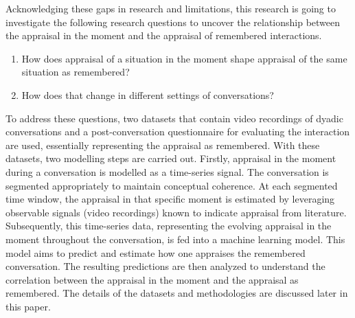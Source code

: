 
Acknowledging these gaps in research and limitations, this research is going to investigate the following research questions to uncover the relationship between the appraisal in the moment and the appraisal of remembered interactions. 

\begin{enumerate}
    \item How does appraisal of a situation in the moment shape appraisal of the same situation as remembered?
    \item How does that change in different settings of conversations?
\end{enumerate}

To address these questions, two datasets that contain video recordings of dyadic conversations and a post-conversation questionnaire for evaluating the interaction are used, essentially representing the appraisal as remembered. With these datasets, two modelling steps are carried out. Firstly, appraisal in the moment during a conversation is modelled as a time-series signal. The conversation is segmented appropriately to maintain conceptual coherence. At each segmented time window, the appraisal in that specific moment is estimated by leveraging observable signals (video recordings) known to indicate appraisal from literature. Subsequently, this time-series data, representing the evolving appraisal in the moment throughout the conversation, is fed into a machine learning model. This model aims to predict and estimate how one appraises the remembered conversation. The resulting predictions are then analyzed to understand the correlation between the appraisal in the moment and the appraisal as remembered. The details of the datasets and methodologies are discussed later in this paper.

